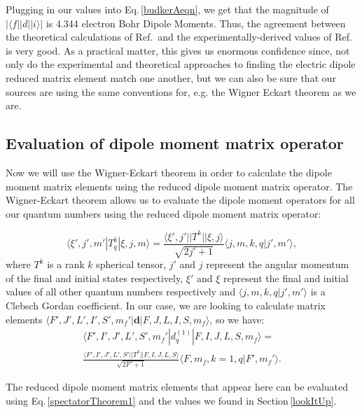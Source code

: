 Plugging in our values into Eq.\,\ref{budkerAeqn}, we get that the magnitude of $|\langle f ||d|| i \rangle|$ is 4.344 electron Bohr Dipole Moments.
 Thus, the agreement between the theoretical calculations of Ref.\,\cite{safronova2photon} and the experimentally-derived values of Ref.\,\cite{NISTasd} is very good. As a practical matter, this gives us enormous confidence since, not only do the experimental and theoretical approaches to finding the electric dipole reduced matrix element match one another, but we can also be sure that our sources are using the same conventions for, e.g. the Wigner Eckart theorem as we are.

\subsection{Evaluation of dipole moment matrix operator}

Now we will use the Wigner-Eckart theorem in order to calculate the dipole moment matrix elements using the reduced dipole moment matrix operator. The Wigner-Eckart theorem allows us to evaluate the dipole moment operators for all our quantum numbers using the reduced dipole moment matrix operator:

\begin{equation}\label{wignerEckart}
\langle \xi',j',m'|T^k_q|\xi,j,m\rangle = \frac{\langle \xi',j'||T^k||\xi,j\rangle}{\sqrt{2j'+1}}\langle j,m,k,q|j',m'\rangle,
\end{equation}
where $T^k$ is a rank $k$ spherical tensor, $j'$ and $j$ represent the angular momentum of the final and initial states respectively, $\xi'$ and $\xi$ represent the final and initial values of all other quantum numbers respectively and $\langle j,m,k,q|j',m'\rangle$ is a Clebsch Gordan coefficient. In our case, we are looking to calculate matrix elements  $\langle F',J',L',I',S',m_f'|\mathbf{d}|F,J,L,I,S,m_f\rangle$, so we have:
\begin{multline}\label{wignerEckartForUs}
\langle F',I',J',L',S',m_f'|d^{(1)}_q|F,I,J,L,S,m_f\rangle =
\\ \frac{\langle F',I',J',L',S'||T^k||F,I,J,L,S\rangle}{\sqrt{2F'+1}}\langle F,m_f,k=1,q|F',m_f'\rangle.
\end{multline}

The reduced dipole moment matrix elements that appear here can be evaluated using Eq.\,\ref{spectatorTheorem1} and the values we found in Section\,\ref{lookItUp}. 


